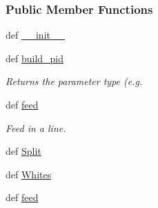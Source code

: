 \subsubsection*{\-Public \-Member \-Functions}
\begin{DoxyCompactItemize}
\item 
def \hyperlink{classforcebalance_1_1psi4io_1_1Grid__Reader_a8bf9998a339ce7491134537affc42466}{\-\_\-\-\_\-init\-\_\-\-\_\-}
\item 
def \hyperlink{classforcebalance_1_1psi4io_1_1Grid__Reader_a81d49a25035103313bcb99a106701e11}{build\-\_\-pid}
\begin{DoxyCompactList}\small\item\em \-Returns the parameter type (e.\-g. \end{DoxyCompactList}\item 
def \hyperlink{classforcebalance_1_1psi4io_1_1Grid__Reader_a900d43fb5dd26718b05846fe666b908d}{feed}
\begin{DoxyCompactList}\small\item\em \-Feed in a line. \end{DoxyCompactList}\item 
def \hyperlink{classforcebalance_1_1BaseReader_acded199bbc003eb93d071a972ef38901}{\-Split}
\item 
def \hyperlink{classforcebalance_1_1BaseReader_af2af8a559625614474a1c6fe245b5e13}{\-Whites}
\item 
def \hyperlink{classforcebalance_1_1BaseReader_a3c46942ef8cc25ece21d52be5b7ba05f}{feed}
\end{DoxyCompactItemize}
